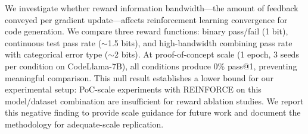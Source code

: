 We investigate whether reward information bandwidth---the amount of feedback conveyed per gradient update---affects reinforcement learning convergence for code generation. We compare three reward functions: binary pass/fail (1 bit), continuous test pass rate ($\sim$1.5 bits), and high-bandwidth combining pass rate with categorical error type ($\sim$2 bits). At proof-of-concept scale (1 epoch, 3 seeds per condition on CodeLlama-7B), all conditions produce 0\% pass@1, preventing meaningful comparison. This null result establishes a lower bound for our experimental setup: PoC-scale experiments with REINFORCE on this model/dataset combination are insufficient for reward ablation studies. We report this negative finding to provide scale guidance for future work and document the methodology for adequate-scale replication.
